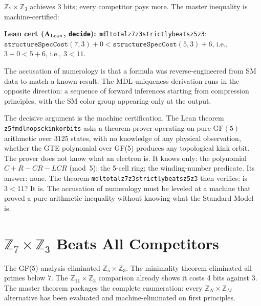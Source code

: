 \documentclass[11pt,openany]{book}
\theoremstyle{remark}
\newcommand{\lean}[1]{%
  \penalty-100
  \begingroup\def\_{\textunderscore\allowbreak}\texttt{#1}\endgroup}
\newcommand{\CatAL}{\ensuremath{\textbf{A}_{\rm Lean}}}
\begin{document}
$\mathbb{Z}_7\times\mathbb{Z}_3$ achieves 3 bits; every competitor pays more.
The master inequality is machine-certified:

\begin{sloppypar}\noindent\textbf{Lean cert (\CatAL, \texttt{decide}):}
\lean{mdl\_total\_z7z3\_strictly\_beats\_z5z3}:
$\mathtt{structureSpecCost}(7,3) + 0 < \mathtt{structureSpecCost}(5,3) + 6$,
i.e., $3 + 0 < 5 + 6$, i.e., $3 < 11$.\end{sloppypar}

\begin{tcolorbox}[colback=yellow!8,colframe=yellow!60!black,
  title={Why This Is Not Numerology}]
The accusation of numerology is that a formula was reverse-engineered from SM data
to match a known result. The MDL uniqueness derivation runs in the opposite direction: a
sequence of forward inferences starting from compression principles, with the SM
color group appearing only at the output.

The decisive argument is the machine certification. The Lean theorem
\lean{z5\_fmdl\_no\_psc\_kink\_orbits} asks a theorem prover operating on pure
$\mathrm{GF}(5)$ arithmetic over 3125 states, with no knowledge of any physical
observation, whether the GTE polynomial over GF(5) produces any topological kink orbit.
The prover does not know what an electron is. It knows only: the polynomial $C+R-CR-LCR$
(mod~5); the 5-cell ring; the winding-number predicate. Its answer: none.
The theorem \lean{mdl\_total\_z7z3\_strictly\_beats\_z5z3} then verifies: is $3 < 11$?
It is. The accusation of numerology must be leveled at a machine that proved a pure
arithmetic inequality without knowing what the Standard Model is.
\end{tcolorbox}

\medskip
\section{$\mathbb{Z}_7\times\mathbb{Z}_3$ Beats All Competitors}
\label{sec:z7z3_wins}

The GF(5) analysis eliminated $\mathbb{Z}_5\times\mathbb{Z}_3$. The minimality
theorem eliminated all primes below 7. The $\mathbb{Z}_{11}\times\mathbb{Z}_3$
comparison already shows it costs 4 bits against 3. The master theorem packages the
complete enumeration: every $\mathbb{Z}_N\times\mathbb{Z}_M$ alternative has been
evaluated and machine-eliminated on first principles.
\end{document}
